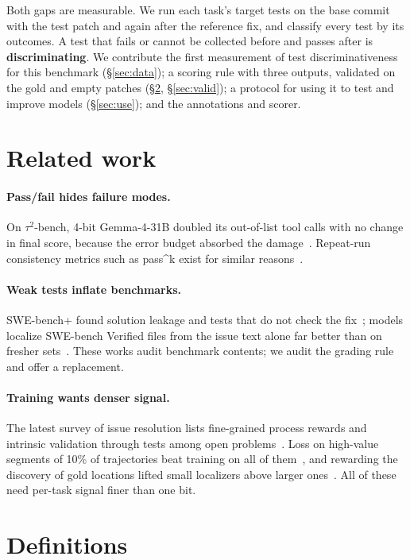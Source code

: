 \documentclass[10pt,a4paper]{article}
\begin{document}
Both gaps are measurable. We run each task's target tests on the base commit with the test patch and again after the reference fix, and classify every test by its outcomes. A test that fails or cannot be collected before and passes after is \textbf{discriminating}. We contribute the first measurement of test discriminativeness for this benchmark (\S\ref{sec:data}); a scoring rule with three outputs, validated on the gold and empty patches (\S\ref{sec:def}, \S\ref{sec:valid}); a protocol for using it to test and improve models (\S\ref{sec:use}); and the annotations and scorer.

\section{Related work}

\paragraph{Pass/fail hides failure modes.} On $\tau^2$-bench, 4-bit Gemma-4-31B doubled its out-of-list tool calls with no change in final score, because the error budget absorbed the damage~\cite{flatscore}. Repeat-run consistency metrics such as pass\textasciicircum{}k exist for similar reasons~\cite{devil}.

\paragraph{Weak tests inflate benchmarks.} SWE-bench+ found solution leakage and tests that do not check the fix~\cite{swebenchplus}; models localize SWE-bench Verified files from the issue text alone far better than on fresher sets~\cite{memory}. These works audit benchmark contents; we audit the grading rule and offer a replacement.

\paragraph{Training wants denser signal.} The latest survey of issue resolution lists fine-grained process rewards and intrinsic validation through tests among open problems~\cite{survey}. Loss on high-value segments of 10\% of trajectories beat training on all of them~\cite{sweprime}, and rewarding the discovery of gold locations lifted small localizers above larger ones~\cite{a2agent}. All of these need per-task signal finer than one bit.

\section{Definitions}\label{sec:def}
\end{document}
